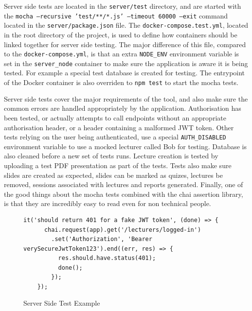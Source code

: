 Server side tests are located in the \texttt{server/test} directory, and are started with the
\texttt{mocha --recursive 'test/**/*.js' --timeout 60000 --exit} command located in the \texttt{server/package.json}
file. The \texttt{docker-compose.test.yml}, located in the root directory of the project, is used to define
how containers should be linked together for server side testing. The major difference of this file, compared
to the \texttt{docker-compose.yml}, is that an extra \texttt{NODE\_ENV} environment variable is set
in the \texttt{server\_node} container to make sure the application is aware it is being tested.
For example a special test database is created for testing. The entrypoint of the Docker container
is also overriden to \texttt{npm test} to start the mocha tests.

Server side tests cover the major requirements of the tool, and also make sure the common errors
are handled appropriately by the application. Authorisation has been tested, or actually attempts
to call endpoints without an appropriate authorisation header, or a header containing a malformed
JWT token. Other tests relying on the user being authenticated, use a special \texttt{AUTH\_DISABLED}
environment variable to use a mocked lecturer called Bob for testing. Database is also
cleaned before a new set of tests runs. Lecture creation is tested by uploading a test PDF
presentation as part of the tests. Tests also make sure slides are created as expected, slides
can be marked as quizes, lectures be removed, sessions associated with lectures and reports
generated. Finally, one of the good things about the mocha tests combined
with the chai assertion library, is that they are incredibly easy to read even for non technical
people.

\begin{figure}[h!]
  \begin{lstlisting}[basicstyle=\small, breaklines=true]
  it('should return 401 for a fake JWT token', (done) => {
      chai.request(app).get('/lecturers/logged-in')
        .set('Authorization', 'Bearer verySecureJwtToken123').end((err, res) => {
          res.should.have.status(401);
          done();
        });
    });
  \end{lstlisting}
  \caption{Server Side Test Example}
  \label{sample:servertest}
\end{figure}

